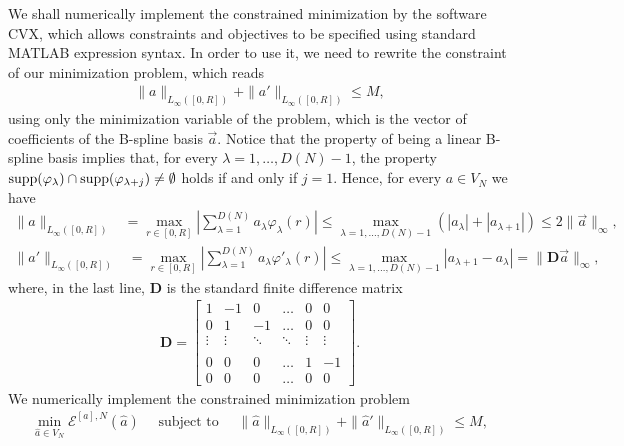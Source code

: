 We shall numerically implement the constrained minimization by the software CVX, which allows constraints and objectives to be specified using standard MATLAB expression syntax. In order to use it, we need to rewrite the constraint of our minimization problem, which reads
\begin{align*}
	\|a\|_{L_{\infty}([0,R])} + \|a'\|_{L_{\infty}([0,R])} \leq M,
\end{align*}
using only the minimization variable of the problem, which is the vector of coefficients of the B-spline basis $\vec{a}$. Notice that the property of being a linear B-spline basis implies that, for every $\lambda = 1, \ldots, D(N)-1$, the property $\operatorname{supp}(\varphi_{\lambda}) \cap \operatorname{supp}(\varphi_{\lambda + j}) \not= \emptyset$ holds if and only if $j = 1$. Hence, for every $a \in V_N$ we have
\begin{align*}
\|a\|_{L_{\infty}([0,R])} &= \max_{r \in [0,R]} \left|\sum^{D(N)}_{\lambda = 1} a_{\lambda} \varphi_{\lambda}(r)\right|
 \leq \max_{\lambda = 1, \ldots, D(N)-1} \left(|a_{\lambda}| + |a_{\lambda+1}|\right) 
 \leq 2 \|\vec{a}\|_{\infty},
\end{align*}
\begin{align*}
\|a'\|_{L_{\infty}([0,R])} &= \max_{r \in [0,R]} \left|\sum^{D(N)}_{\lambda = 1} a_{\lambda} \varphi'_{\lambda}(r)\right| 
 \leq \max_{\lambda = 1, \ldots, D(N)-1} |a_{\lambda+1} - a_{\lambda}|
 = \|\mathbf D\vec{a}\|_{\infty},
\end{align*}
where, in the last line, $\mathbf  D$ is the standard finite difference matrix
\begin{align*}
\mathbf  D = \begin{bmatrix}
    1       & -1 & 0 & \dots & 0 & 0 \\
    0     & 1 & -1 & \dots & 0 & 0 \\
   \vdots & \vdots & \ddots & \ddots & \vdots & \vdots \\ \\
    0       & 0 & 0 & \dots & 1 & -1 \\
    0       & 0 & 0 & \dots & 0 & 0
\end{bmatrix}.
\end{align*}
We numerically implement the constrained minimization problem
\begin{align*}
\min_{\widehat{a} \in V_N} \mathcal{E}^{[a],N}(\widehat{a}) \quad \text{ subject to } \quad \|\widehat{a}\|_{L_{\infty}([0,R])} + \|\widehat{a}'\|_{L_{\infty}([0,R])} \leq M,
\end{align*}
